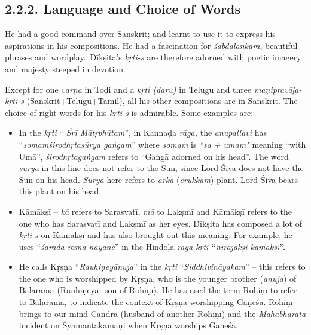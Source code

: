 \subsection*{2.2.2. Language and Choice of Words}

He had a good command over Sanskrit; and learnt to use it to express his aspirations in his compositions. He had a fascination for \textit{śabdālaṅkāra}, beautiful phrases and wordplay.~Dīkṣita’s \textit{kṛti-s} are therefore adorned with poetic imagery and majesty steeped in devotion.

Except for one \textit{varṇa} in Toḍi and a\textit{ kṛti (daru)} in Telugu and three \textit{maṇipravāḷa- kṛti-s} (Sanskrit+Telugu+Tamil), all his other compositions are in Sanskrit. The choice of right words for his \textit{kṛti-s} is admirable. Some examples are:

\begin{itemize}

 \item In the \textit{kṛti} “ \textit{Śrī Mātṛbhūtam}”, in Kannaḍa \textit{rāga,} the \textit{anupallavi} has “\textit{somamśirodhṛtasūrya gaṅgam}” where \textit{somam} is \textit{“sa + umam"} meaning “with Umā”, \textit{ śirodhṛtagaṅgam} refers to “Gaṅgā adorned on his head”. The word \textit{sūrya} in this line does not refer to the Sun, since Lord Śiva does not have the Sun on his head. \textit{Sūrya} here refers to \textit{arka} (\textit{erukkam}) plant. Lord Śiva bears this plant on his head.

 \item Kāmākṣī – \textit{kā} refers to Sarasvatī, \textit{mā} to Lakṣmī and Kāmākṣī refers to the one who has Sarasvatī and Lakṣmī as her eyes. Dīkṣita has composed a lot of \textit{kṛti-s} on Kāmākṣī and has also brought out this meaning. For example, he uses “\textit{śāradā-ramā-nayane}” in the Hindoḷa\textit{ rāga kṛti} \textbf{“}\textit{nīrajākṣi kāmākṣī}\textbf{”.}

 \item He calls Kṛṣṇa “\textit{Rauhiṇeyānuja}” in the \textit{kṛti} “\textit{Siddhivināyakam}” – this refers to the one who is worshipped by Kṛṣṇa, who is the younger brother (\textit{anuja}) of Balarāma (Rauhiṇeya- son of Rohiṇī). He has used the term Rohiṇī to refer to Balarāma, to indicate the context of Kṛṣṇa worshipping Gaṇeśa. Rohiṇī brings to our mind Candra (husband of another Rohiṇī) and the \textit{Mahābhārata} incident on Śyamantakamaṇi when Kṛṣṇa worships Gaṇeśa.

\end{itemize}


